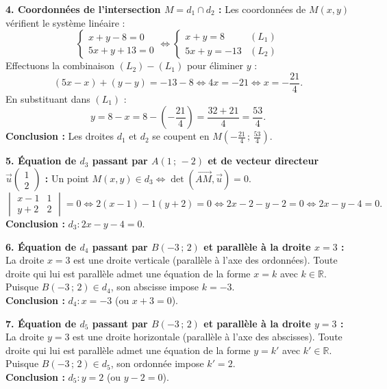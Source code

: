 \documentclass[11pt,a4paper]{article}
\newcommand{\R}{\mathbb{R}}
\newcommand{\vect}[1]{\overrightarrow{#1}}
\renewcommand{\det}{\operatorname{det}}
\begin{document}
\begin{correctionbox}
\textbf{4. Coordonnées de l'intersection $M = d_1 \cap d_2$ :}
Les coordonnées de $M(x, y)$ vérifient le système linéaire :
\[
\begin{cases}
x + y - 8 = 0 \\
5x + y + 13 = 0
\end{cases}
\iff
\begin{cases}
x + y = 8 & (L_1) \\
5x + y = -13 & (L_2)
\end{cases}
\]
Effectuons la combinaison $(L_2) - (L_1)$ pour éliminer $y$ :
\[
(5x - x) + (y - y) = -13 - 8 \iff 4x = -21 \iff x = -\frac{21}{4}.
\]
En substituant dans $(L_1)$ :
\[
y = 8 - x = 8 - \left(-\frac{21}{4}\right) = \frac{32 + 21}{4} = \frac{53}{4}.
\]
\textbf{Conclusion :} Les droites $d_1$ et $d_2$ se coupent en $M\left(-\frac{21}{4} \,;\, \frac{53}{4}\right)$.

\textbf{5. Équation de $d_3$ passant par $A(1\,;\,-2)$ et de vecteur directeur $\vec{u}\begin{pmatrix} 1 \\ 2 \end{pmatrix}$ :}
Un point $M(x, y) \in d_3 \iff \det(\vect{AM}, \vec{u}) = 0$.
\[
\begin{vmatrix} x - 1 & 1 \\ y + 2 & 2 \end{vmatrix} = 0 \iff 2(x - 1) - 1(y + 2) = 0 \iff 2x - 2 - y - 2 = 0 \iff 2x - y - 4 = 0.
\]
\textbf{Conclusion :} $d_3 : 2x - y - 4 = 0$.

\textbf{6. Équation de $d_4$ passant par $B(-3\,;\,2)$ et parallèle à la droite $x = 3$ :}
La droite $x = 3$ est une droite verticale (parallèle à l'axe des ordonnées). Toute droite qui lui est parallèle admet une équation de la forme $x = k$ avec $k \in \R$.
Puisque $B(-3\,;\,2) \in d_4$, son abscisse impose $k = -3$.\\
\textbf{Conclusion :} $d_4 : x = -3$ \quad (ou $x + 3 = 0$).

\textbf{7. Équation de $d_5$ passant par $B(-3\,;\,2)$ et parallèle à la droite $y = 3$ :}
La droite $y = 3$ est une droite horizontale (parallèle à l'axe des abscisses). Toute droite qui lui est parallèle admet une équation de la forme $y = k'$ avec $k' \in \R$.
Puisque $B(-3\,;\,2) \in d_5$, son ordonnée impose $k' = 2$.\\
\textbf{Conclusion :} $d_5 : y = 2$ \quad (ou $y - 2 = 0$).
\end{correctionbox}

\vspace{0.6cm}
\end{document}
